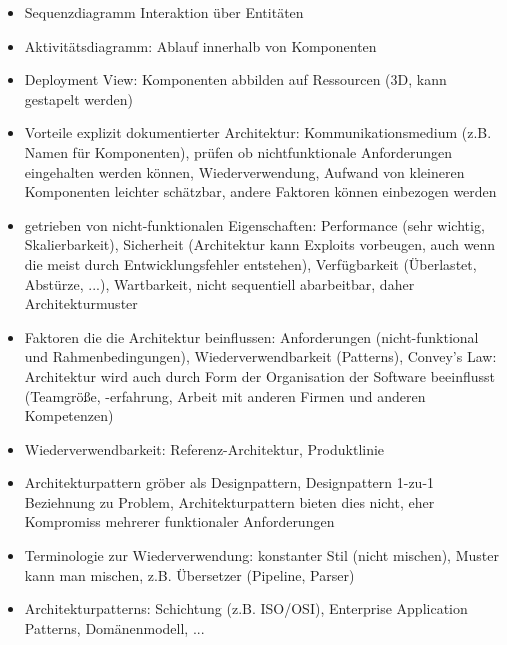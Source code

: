 \documentclass[paper=a4, fontsize=11pt]{scrartcl} %
\numberwithin{equation}{section} %
\numberwithin{figure}{section} %
\numberwithin{table}{section} %
\begin{document}
\begin{itemize}
  \item Sequenzdiagramm Interaktion über Entitäten
  \item Aktivitätsdiagramm: Ablauf innerhalb von Komponenten
  \item Deployment View: Komponenten abbilden auf Ressourcen (3D, kann gestapelt werden)
  \item Vorteile explizit dokumentierter Architektur: Kommunikationsmedium (z.B. Namen für Komponenten), prüfen ob nichtfunktionale Anforderungen eingehalten werden können, Wiederverwendung, Aufwand von kleineren Komponenten leichter schätzbar, andere Faktoren können einbezogen werden
  \item getrieben von nicht-funktionalen Eigenschaften: Performance (sehr wichtig, Skalierbarkeit), Sicherheit (Architektur kann Exploits vorbeugen, auch wenn die meist durch Entwicklungsfehler entstehen), Verfügbarkeit (Überlastet, Abstürze, ...), Wartbarkeit, nicht sequentiell abarbeitbar, daher Architekturmuster
  \item Faktoren die die Architektur beinflussen: Anforderungen (nicht-funktional und Rahmenbedingungen), Wiederverwendbarkeit (Patterns), Convey's Law: Architektur wird auch durch Form der Organisation der Software beeinflusst (Teamgröße, -erfahrung, Arbeit mit anderen Firmen und anderen Kompetenzen)
  \item Wiederverwendbarkeit: Referenz-Architektur, Produktlinie
  \item Architekturpattern gröber als Designpattern, Designpattern 1-zu-1 Beziehnung zu Problem, Architekturpattern bieten dies nicht, eher Kompromiss mehrerer funktionaler Anforderungen
  \item Terminologie zur Wiederverwendung: konstanter Stil (nicht mischen), Muster kann man mischen, z.B. Übersetzer (Pipeline, Parser)
  \item Architekturpatterns: Schichtung (z.B. ISO/OSI), Enterprise Application Patterns, Domänenmodell, ...
\end{itemize}
\end{document}
